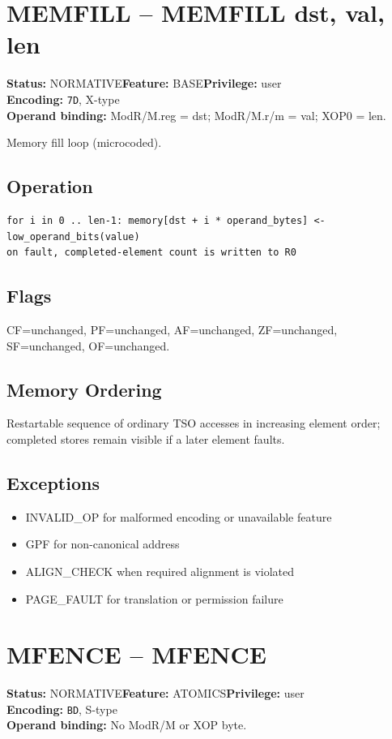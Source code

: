 \documentclass[10pt]{article}
\begin{document}
\section{MEMFILL -- MEMFILL dst, val, len}
\textbf{Status:} NORMATIVE\quad \textbf{Feature:} BASE\quad \textbf{Privilege:} user\\
\textbf{Encoding:} \texttt{7D}, X-type\\
\textbf{Operand binding:} ModR/M.reg = dst; ModR/M.r/m = val; XOP0 = len.

Memory fill loop (microcoded).

\subsection*{Operation}
\begin{lstlisting}
for i in 0 .. len-1: memory[dst + i * operand_bytes] <- low_operand_bits(value)
on fault, completed-element count is written to R0
\end{lstlisting}
\subsection*{Flags}
CF=unchanged, PF=unchanged, AF=unchanged, ZF=unchanged, SF=unchanged, OF=unchanged.
\subsection*{Memory Ordering}
Restartable sequence of ordinary TSO accesses in increasing element order; completed stores remain visible if a later element faults.
\subsection*{Exceptions}
\begin{itemize}
\item INVALID\_OP for malformed encoding or unavailable feature
\item GPF for non-canonical address
\item ALIGN\_CHECK when required alignment is violated
\item PAGE\_FAULT for translation or permission failure
\end{itemize}
\clearpage

\section{MFENCE -- MFENCE}
\textbf{Status:} NORMATIVE\quad \textbf{Feature:} ATOMICS\quad \textbf{Privilege:} user\\
\textbf{Encoding:} \texttt{BD}, S-type\\
\textbf{Operand binding:} No ModR/M or XOP byte.
\end{document}
